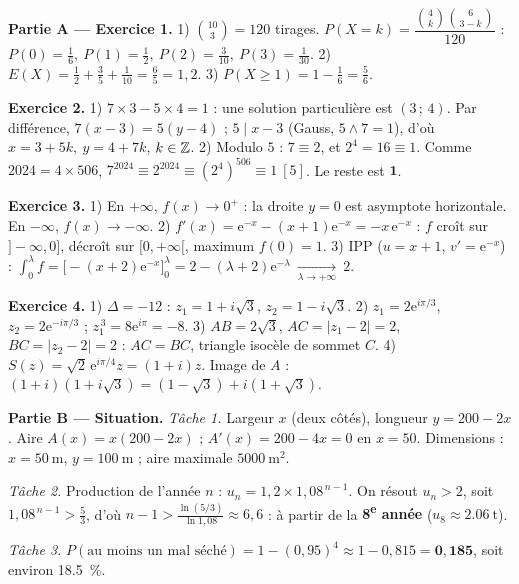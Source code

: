 
\noindent\textbf{Partie A — Exercice 1.}
1) $\binom{10}{3}=120$ tirages. $P(X{=}k)=\dfrac{\binom4k\binom6{3-k}}{120}$ :
$P(0)=\frac16,\ P(1)=\frac12,\ P(2)=\frac3{10},\ P(3)=\frac1{30}$.
2) $E(X)=\frac12+\frac35+\frac1{10}=\frac65=1{,}2$.
3) $P(X\ge1)=1-\frac16=\frac56$.

\noindent\textbf{Exercice 2.}
1) $7\times3-5\times4=1$ : une solution particulière est $(3\,;\,4)$. Par différence,
$7(x-3)=5(y-4)$ ; $5\mid x-3$ (Gauss, $5\wedge7=1$), d'où $x=3+5k,\ y=4+7k$, $k\in\mathbb{Z}$.
2) Modulo $5$ : $7\equiv2$, et $2^4=16\equiv1$. Comme $2024=4\times506$, $7^{2024}\equiv2^{2024}\equiv(2^4)^{506}\equiv1\ [5]$.
Le reste est $\mathbf{1}$.

\noindent\textbf{Exercice 3.}
1) En $+\infty$, $f(x)\to0^+$ : la droite $y=0$ est asymptote horizontale. En $-\infty$, $f(x)\to-\infty$.
2) $f'(x)=\mathrm{e}^{-x}-(x+1)\mathrm{e}^{-x}=-x\,\mathrm{e}^{-x}$ : $f$ croît sur $]-\infty,0]$, décroît sur $[0,+\infty[$, maximum $f(0)=1$.
3) IPP ($u=x+1$, $v'=\mathrm{e}^{-x}$) : $\int_0^\lambda f=\big[-(x+2)\mathrm{e}^{-x}\big]_0^\lambda=2-(\lambda+2)\mathrm{e}^{-\lambda}\ \xrightarrow[\lambda\to+\infty]{}\ 2$.

\noindent\textbf{Exercice 4.}
1) $\Delta=-12$ : $z_1=1+i\sqrt3$, $z_2=1-i\sqrt3$.
2) $z_1=2\mathrm{e}^{i\pi/3}$, $z_2=2\mathrm{e}^{-i\pi/3}$ ; $z_1^{\,3}=8\mathrm{e}^{i\pi}=-8$.
3) $AB=2\sqrt3$, $AC=|z_1-2|=2$, $BC=|z_2-2|=2$ : $AC=BC$, triangle isocèle de sommet $C$.
4) $S(z)=\sqrt2\,\mathrm{e}^{i\pi/4}z=(1+i)z$. Image de $A$ : $(1+i)(1+i\sqrt3)=(1-\sqrt3)+i(1+\sqrt3)$.

\smallskip
\noindent\textbf{Partie B — Situation.}
\emph{Tâche 1.} Largeur $x$ (deux côtés), longueur $y=200-2x$. Aire $A(x)=x(200-2x)$ ;
$A'(x)=200-4x=0$ en $x=50$. Dimensions : $x=\SI{50}{\metre}$, $y=\SI{100}{\metre}$ ; aire maximale $\SI{5000}{\metre\squared}$.

\emph{Tâche 2.} Production de l'année $n$ : $u_n=1{,}2\times1{,}08^{\,n-1}$. On résout $u_n>2$,
soit $1{,}08^{\,n-1}>\frac53$, d'où $n-1>\frac{\ln(5/3)}{\ln1{,}08}\approx6{,}6$ : à partir de la
\textbf{8\textsuperscript{e} année} ($u_8\approx\SI{2,06}{\tonne}$).

\emph{Tâche 3.} $P(\text{au moins un mal séché})=1-(0{,}95)^4\approx1-0{,}815=\mathbf{0{,}185}$, soit environ \SI{18,5}{\percent}.
